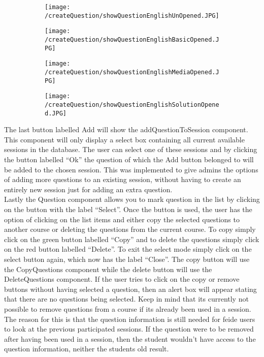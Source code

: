 \begin{figure}[H]
	\centering
	\begin{subfigure}{0.80\linewidth}
		\texttt{[image: /createQuestion/showQuestionEnglishUnOpened.JPG]}
		\caption{}
		\label{fig:showQuestionUnOpened}
	\end{subfigure}
	\begin{subfigure}{0.32\linewidth}
		\texttt{[image: /createQuestion/showQuestionEnglishBasicOpened.JPG]}
		\caption{}
		\label{fig:showQuestionBasicOpened}
	\end{subfigure}
	\begin{subfigure}{0.32\linewidth}
		\texttt{[image: /createQuestion/showQuestionEnglishMediaOpened.JPG]}
		\caption{}
		\label{fig:showQuestionMediaOpened}
	\end{subfigure}
	\begin{subfigure}{0.32\linewidth}
		\texttt{[image: /createQuestion/showQuestionEnglishSolutionOpened.JPG]}
		\caption{}
		\label{fig:showQuestionSolutionOpened}
	\end{subfigure}
\end{figure}
The last button labelled Add will show the addQuestionToSession component. This component will only display a select box containing all current available sessions in the database. The user can select one of these sessions and by clicking the button labelled “Ok” the question of which the Add button belonged to will be added to the chosen session. This was implemented to give admins the options of adding more questions to an existing session, without having to create an entirely new session just for adding an extra question.\\[11pt]
Lastly the Question component allows you to mark question in the list by clicking on the button with the label “Select”. Once the button is used, the user has the option of clicking on the list items and either copy the selected questions to another course or deleting the questions from the current course. To copy simply click on the green button labelled “Copy” and to delete the questions simply click on the red button labelled “Delete”. To exit the select mode simply click on the select button again, which now has the label “Close”. The copy button will use the CopyQuestions component while the delete button will use the DeleteQuestions component. If the user tries to click on the copy or remove buttons without having selected a question, then an alert box will appear stating that there are no questions being selected. Keep in mind that its currently not possible to remove questions from a course if its already been used in a session. The reason for this is that the question information is still needed for feide users to look at the previous participated sessions. If the question were to be removed after having been used in a session, then the student wouldn’t have access to the question information, neither the students old result. \\[11pt]
